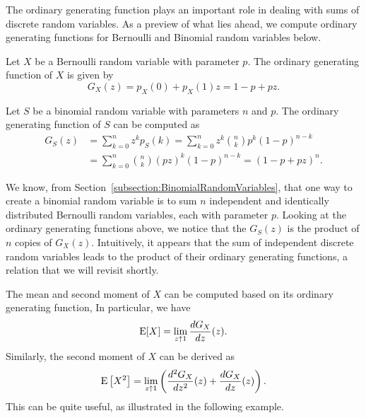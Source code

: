 The ordinary generating function plays an important role in dealing with sums of discrete random variables.
As a preview of what lies ahead, we compute ordinary generating functions for Bernoulli and Binomial random variables below.

\begin{example}
Let $X$ be a Bernoulli random variable with parameter $p$.
The ordinary generating function of $X$ is given by
\begin{equation*}
G_X(z) = p_X(0) + p_X(1) z
= 1 - p + pz .
\end{equation*}
\end{example}

\begin{example}
Let $S$ be a binomial random variable with parameters $n$ and $p$.
The ordinary generating function of $S$ can be computed as
\begin{equation*}
\begin{split}
G_S(z) &= \sum_{k=0}^{n} z^k p_S (k)
= \sum_{k=0}^{n} z^k \binom{n}{k} p^k (1 - p)^{n-k} \\
&= \sum_{k=0}^{n} \binom{n}{k} (pz)^k (1 - p)^{n-k}
= (1 - p + pz)^n .
\end{split}
\end{equation*}
\end{example}

We know, from Section~\ref{subsection:BinomialRandomVariables}, that one way to create a binomial random variable is to sum $n$ independent and identically distributed Bernoulli random variables, each with parameter $p$.
Looking at the ordinary generating functions above, we notice that the $G_S(z)$ is the product of $n$ copies of $G_X(z)$.
Intuitively, it appears that the sum of independent discrete random variables leads to the product of their ordinary generating functions, a relation that we will revisit shortly.

The mean and second moment of $X$ can be computed based on its ordinary generating function,
In particular, we have
\begin{equation*}
\mathrm{E} [X] = \lim_{z \uparrow 1} \frac{d G_X}{dz}(z) .
\end{equation*}
Similarly, the second moment of $X$ can be derived as
\begin{equation*}
\mathrm{E} \left[ X^2 \right]
= \lim_{z \uparrow 1} \left( \frac{d^2 G_X}{dz^2}(z) + \frac{d G_X}{dz}(z) \right) .
\end{equation*}
This can be quite useful, as illustrated in the following example.

